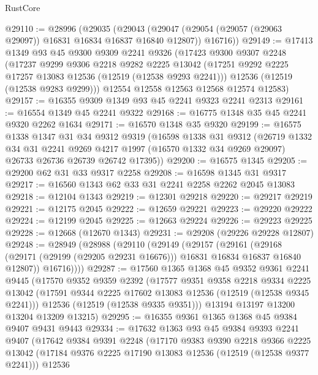 \begin{lexlean}{RustCore}
\begin{coremodule}
@29110 := @28996
    (@29035
      (@29043 (@29047 (@29054 (@29057 (@29063 @29097)) @16831 @16834 @16837 @16840 @12807)) @16716))
@29149 := @17413
    @1349
    @93
    @45
    @9300
    @9309
    @2241
    @9326
    (@17423
      @9300
      @9307
      @2248
      (@17237
        @9299
        @9306
        @2218
        @9282
        @2225
        @13042
        (@17251 @9292 @2225 @17257 @13083 @12536 (@12519 (@12538 @9293 @2241)))
        @12536
        (@12519 (@12538 @9283 @9299)))
      @12554
      @12558
      @12563
      @12568
      @12574
      @12583)
@29157 := @16355 @9309 @1349 @93 @45 @2241 @9323 @2241 @2313
@29161 := @16554 @1349 @45 @2241 @9322
@29168 := @16775 @1348 @35 @45 @2241 @9320 @2262 @1634
@29171 := @16570 @1348 @35 @9320
@29199 := @16575
    @1338
    @1347
    @31
    @34
    @9312
    @9319
    (@16598
      @1338
      @31
      @9312
      (@26719
        @1332
        @34
        @31
        @2241
        @9269
        @4217
        @1997
        (@16570 @1332 @34 @9269 @29097)
        @26733
        @26736
        @26739
        @26742
        @17395))
@29200 := @16575 @1345
@29205 := @29200 @62 @31 @33 @9317 @2258
@29208 := @16598 @1345 @31 @9317
@29217 := @16560 @1343 @62 @33 @31 @2241 @2258 @2262 @2045 @13083
@29218 := @12104 @1343
@29219 := @12301 @29218
@29220 := @29217 @29219
@29221 := @12175 @2045
@29222 := @12659 @29221
@29223 := @29220 @29222
@29224 := @12199 @2045
@29225 := @12663 @29224
@29226 := @29223 @29225
@29228 := @12668 (@12670 @1343)
@29231 := @29208 (@29226 @29228 @12807)
@29248 := @28949
    (@28988
      (@29110
        (@29149
          (@29157
            (@29161
              (@29168 (@29171 (@29199 (@29205 @29231 @16676))) @16831 @16834 @16837 @16840 @12807))
            @16716))))
@29287 := @17560
    @1365
    @1368
    @45
    @9352
    @9361
    @2241
    @9445
    (@17570
      @9352
      @9359
      @2392
      (@17577
        @9351
        @9358
        @2218
        @9334
        @2225
        @13042
        (@17591 @9344 @2225 @17602 @13083 @12536 (@12519 (@12538 @9345 @2241)))
        @12536
        (@12519 (@12538 @9335 @9351)))
      @13194
      @13197
      @13200
      @13204
      @13209
      @13215)
@29295 := @16355 @9361 @1365 @1368 @45 @9384 @9407 @9431 @9443
@29334 := @17632
    @1363
    @93
    @45
    @9384
    @9393
    @2241
    @9407
    (@17642
      @9384
      @9391
      @2248
      (@17170
        @9383
        @9390
        @2218
        @9366
        @2225
        @13042
        (@17184 @9376 @2225 @17190 @13083 @12536 (@12519 (@12538 @9377 @2241)))
        @12536

\end{coremodule}
\end{lexlean}

